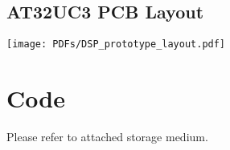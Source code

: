 \documentclass[11pt, a4paper, oneside]{Thesis} %
\begin{document}
\section{AT32UC3 PCB Layout}
\begin{center}
\texttt{[image: PDFs/DSP\_prototype\_layout.pdf]}
\end{center}



\chapter{Code}
\label{AppendixC}
Please refer to attached storage medium.


\backmatter

\label{Bibliography}

\end{document}
